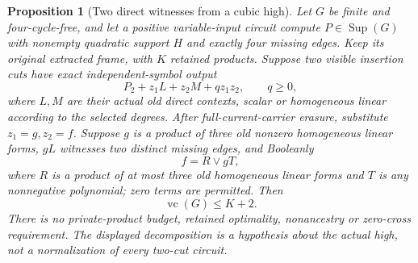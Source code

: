 \documentclass[11pt]{article}
\newcommand{\Sup}{\operatorname{Sup}}
\newcommand{\vc}{\operatorname{vc}}
\newtheorem{proposition}[theorem]{Proposition}
\theoremstyle{definition}
\theoremstyle{remark}
\begin{document}
\begin{proposition}[Two direct witnesses from a cubic high]
\label{prop:twowitnesscover}
Let $G$ be finite and four-cycle-free, and let a positive variable-input
circuit compute $P\in\Sup(G)$ with nonempty quadratic support $H$ and
exactly four missing edges. Keep its original extracted frame, with $K$
retained products. Suppose two visible insertion cuts have exact
independent-symbol output
\[
 P_2+z_1L+z_2M+qz_1z_2,\qquad q\ge0,
\]
where $L,M$ are their actual old direct contexts, scalar or homogeneous
linear according to the selected degrees. After full-current-carrier
erasure, substitute $z_1=g,z_2=f$. Suppose $g$ is a product of three old
nonzero homogeneous linear forms, $gL$ witnesses two distinct missing
edges, and Booleanly
\[
 f=R\vee gT,
\]
where $R$ is a product of at most three old homogeneous linear forms and
$T$ is any nonnegative polynomial; zero terms are permitted. Then
\[
 \vc(G)\le K+2.
\]
There is no private-product budget, retained optimality, nonancestry or
zero-cross requirement. The displayed decomposition is a hypothesis about
the actual high, not a normalization of every two-cut circuit.
\end{proposition}
\end{document}
